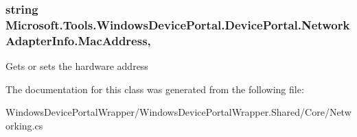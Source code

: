 \subsubsection[{\texorpdfstring{Mac\+Address}{MacAddress}}]{\setlength{\rightskip}{0pt plus 5cm}string Microsoft.\+Tools.\+Windows\+Device\+Portal.\+Device\+Portal.\+Network\+Adapter\+Info.\+Mac\+Address\hspace{0.3cm}{\ttfamily [get]}, {\ttfamily [set]}}\hypertarget{class_microsoft_1_1_tools_1_1_windows_device_portal_1_1_device_portal_1_1_network_adapter_info_a9f5a3d0a2af048fe9ff9667e9bbb2d37}{}\label{class_microsoft_1_1_tools_1_1_windows_device_portal_1_1_device_portal_1_1_network_adapter_info_a9f5a3d0a2af048fe9ff9667e9bbb2d37}


Gets or sets the hardware address 



The documentation for this class was generated from the following file\+:\begin{DoxyCompactItemize}
\item 
Windows\+Device\+Portal\+Wrapper/\+Windows\+Device\+Portal\+Wrapper.\+Shared/\+Core/Networking.\+cs\end{DoxyCompactItemize}

